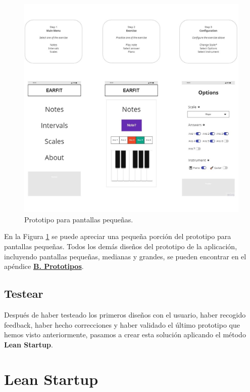\documentclass[12pt,twoside,titlepage]{report}
\begin{document}
\begin{figure}[H]
    \centering
    \includegraphics[width=\textwidth]{Design Thinking/Prototipo/Small/PrototipoOld}
    \caption{Prototipo para pantallas pequeñas.}
    \label{fig:PrototipoSmall}
\end{figure}

En la Figura \ref{fig:PrototipoSmall} se puede apreciar una pequeña porción del prototipo para pantallas pequeñas. Todos los demás diseños del prototipo de la aplicación, incluyendo pantallas pequeñas, medianas y grandes, se pueden encontrar en el apéndice \hyperref[sec:Prototipos]{\textbf{B. Prototipos}}.

\subsection{Testear}
\label{sec:testear}

Después de haber testeado los primeros diseños con el usuario, haber recogido feedback, haber hecho correcciones y haber validado el último prototipo que hemos visto anteriormente, pasamos a crear esta solución aplicando el método \textbf{Lean Startup}.

\section{Lean Startup}
\label{sec:lean}
\end{document}

